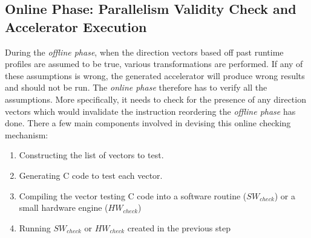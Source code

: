 \subsection{Online Phase: Parallelism Validity Check and Accelerator Execution}
\label{onlinephase}

During the \textit{offline phase}, when the direction vectors based off past runtime profiles are assumed to be true, various transformations are performed. If any of these
assumptions is wrong, the generated accelerator will produce wrong results and should not be run. The \textit{online phase} therefore has to verify all the assumptions. More specifically, it needs to check for the presence of any direction vectors which would
invalidate the instruction reordering the \textit{offline phase} has done. 
There a few main components involved in devising this online checking mechanism:
\begin{enumerate}
    \item Constructing the list of vectors to test.  
    \item Generating C code to test each vector. 
    \item Compiling the vector testing C code into a software routine ($SW_{check}$) or a small hardware engine ($HW_{check}$)
    \item Running $SW_{check}$ or $HW_{check}$ created in the previous step
\end{enumerate}

